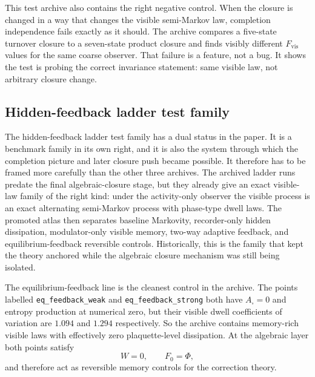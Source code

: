 \documentclass[11pt]{article}
\numberwithin{equation}{section}
\theoremstyle{thmcompact}
\theoremstyle{remark}
\begin{document}
This test archive also contains the right negative control. When the closure is changed in a way that changes the visible semi-Markov law, completion independence fails exactly as it should. The archive compares a five-state turnover closure to a seven-state product closure and finds visibly different $F_{\mathrm{vis}}$ values for the same coarse observer. That failure is a feature, not a bug. It shows the test is probing the correct invariance statement: same visible law, not arbitrary closure change.


\subsection{Hidden-feedback ladder test family}

The hidden-feedback ladder test family has a dual status in the paper. It is a benchmark family in its own right, and it is also the system through which the completion picture and later closure push became possible. It therefore has to be framed more carefully than the other three archives. The archived ladder runs predate the final algebraic-closure stage, but they already give an exact visible-law family of the right kind: under the activity-only observer the visible process is an exact alternating semi-Markov process with phase-type dwell laws. The promoted atlas then separates baseline Markovity, recorder-only hidden dissipation, modulator-only visible memory, two-way adaptive feedback, and equilibrium-feedback reversible controls. Historically, this is the family that kept the theory anchored while the algebraic closure mechanism was still being isolated.

The equilibrium-feedback line is the cleanest control in the archive. The points labelled \texttt{eq\_feedback\_weak} and \texttt{eq\_feedback\_strong} both have $A_\square=0$ and entropy production at numerical zero, but their visible dwell coefficients of variation are $1.094$ and $1.294$ respectively. So the archive contains memory-rich visible laws with effectively zero plaquette-level dissipation. At the algebraic layer both points satisfy
\[
W=0,
\qquad
F_0=\Phi,
\]
and therefore act as reversible memory controls for the correction theory.
\end{document}
